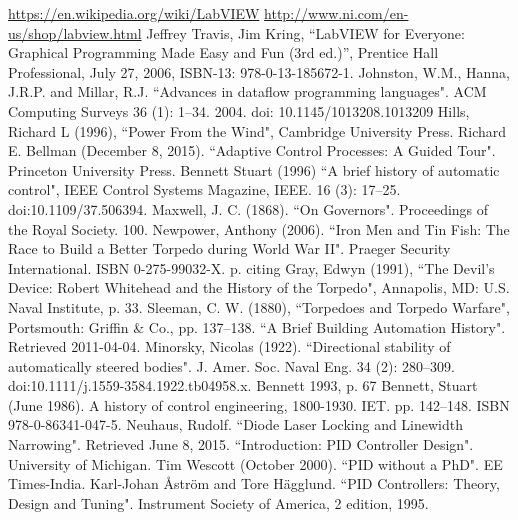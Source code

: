 
\begin{thebibliography}{99}

 \url{https://en.wikipedia.org/wiki/LabVIEW}
 \url{http://www.ni.com/en-us/shop/labview.html}
 Jeffrey Travis, Jim Kring, “LabVIEW for Everyone: Graphical Programming Made Easy and Fun (3rd ed.)”, Prentice Hall Professional, July 27, 2006, ISBN-13: 978-0-13-185672-1.
 Johnston, W.M., Hanna, J.R.P. and Millar, R.J. ``Advances in dataflow programming languages". ACM Computing Surveys 36 (1): 1–34. 2004. doi: 10.1145/1013208.1013209
 Hills, Richard L (1996), ``Power From the Wind", Cambridge University Press.
 Richard E. Bellman (December 8, 2015). ``Adaptive Control Processes: A Guided Tour". Princeton University Press.
 Bennett Stuart (1996) ``A brief history of automatic control", IEEE Control Systems Magazine, IEEE. 16 (3): 17–25. doi:10.1109/37.506394.
 Maxwell, J. C. (1868). ``On Governors". Proceedings of the Royal Society. 100.
 Newpower, Anthony (2006). ``Iron Men and Tin Fish: The Race to Build a Better Torpedo during World War II". Praeger Security International. ISBN 0-275-99032-X. p.  citing Gray, Edwyn (1991), ``The Devil's Device: Robert Whitehead and the History of the Torpedo", Annapolis, MD: U.S. Naval Institute, p. 33.
 Sleeman, C. W. (1880), ``Torpedoes and Torpedo Warfare", Portsmouth: Griffin & Co., pp. 137–138.
 ``A Brief Building Automation History". Retrieved 2011-04-04.
 Minorsky, Nicolas (1922). ``Directional stability of automatically steered bodies". J. Amer. Soc. Naval Eng. 34 (2): 280–309. doi:10.1111/j.1559-3584.1922.tb04958.x.
 Bennett 1993, p. 67
 Bennett, Stuart (June 1986). A history of control engineering, 1800-1930. IET. pp. 142–148. ISBN 978-0-86341-047-5.
 Neuhaus, Rudolf. ``Diode Laser Locking and Linewidth Narrowing". Retrieved June 8, 2015.
 ``Introduction: PID Controller Design". University of Michigan.
 Tim Wescott (October 2000). ``PID without a PhD". EE Times-India.
 Karl-Johan Åström and Tore Hägglund. ``PID Controllers: Theory, Design and Tuning". Instrument Society of America, 2 edition, 1995.




\end{thebibliography}
